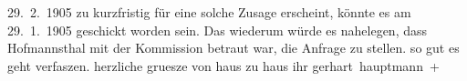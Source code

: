 \begin{ledgroupsized}[t]{13cm}
{{{                     29. 2. 1905 zu kurzfristig für eine solche Zusage erscheint,
                  könnte es am 29. 1. 1905 geschickt worden sein. Das wiederum würde es
                  nahelegen, dass Hofmannsthal mit der
                  Kommission betraut war, die Anfrage zu stellen.}}}\label{K_L01496_1h} so gut es geht verfaszen.
               herzliche gruesze von haus zu haus ihr \spacefill\mbox{gerhart hauptmann +}\pend
           
         
         \endnumbering{}\end{ledgroupsized}  \newcommand{\dateiname}{L01496}\newcommand{\titel}{Gerhart Hauptmann an Arthur Schnitzler, 29. [1. 1905?]}\newcommand{\editorInnen}{Martin Anton Müller und Gerd-Hermann Susen}
      